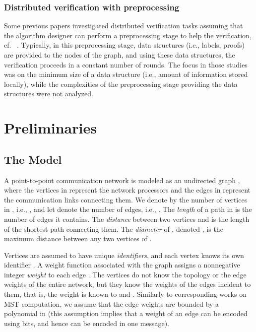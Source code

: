 \documentclass[11pt,letter]{article}
\begin{document}
\subsubsection{Distributed verification with preprocessing}\label{preprocessing}

Some previous 
papers investigated distributed verification tasks assuming that the algorithm 
designer can perform a preprocessing stage to help the verification, 
cf. ~\cite{AKY97,APV,silent,KK07,KKP10}. 
Typically, in this preprocessing stage, data structures (i.e., labels, proofs) 
are provided to the nodes of the graph, and using these data structures, 
the verification proceeds in a constant number of rounds. The focus in those 
studies was on the  minimum size of a data structure (i.e., amount of 
information stored locally), while the complexities of the preprocessing stage 
providing the data structures were not analyzed. 

 \section{Preliminaries}

\subsection{The Model}

A point-to-point communication network is modeled as an undirected
graph ,
where the vertices in  represent the network processors and the
edges in  represent the communication links connecting them. We denote by  the number of vertices in , i.e., , and let  denote the number of edges, i.e., .
The {\em length} of a path in   is the number of edges it
contains. The {\em distance} between two vertices  and  is
 the length of the shortest path connecting them. 
The {\em diameter} of , denoted , is the maximum distance
between any two vertices of .

Vertices are assumed to have unique {\em identifiers}, 
and each vertex  knows its own identifier .
A weight function  associated with the
graph assigns a nonnegative integer {\em weight}  to each edge
.  The vertices do not know the topology or the edge weights of the
entire network, but they  know the weights of the edges incident to them, that is, the weight  is known to   and . 
Similarly to corresponding works on MST computation,  we assume that the edge weights are bounded by a polynomial in  
(this assumption implies that a weight of an edge can be encoded using  bits, and hence can be encoded in one message). 
 
\end{document}
